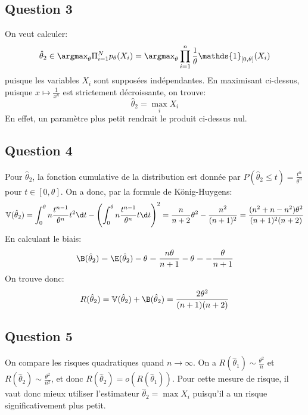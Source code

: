 \documentclass[math, info]{mpb-cours}
\def\that{\hat{\theta}}
\def\V{\mathbb{V}}
\begin{document}
\subsection{Question 3}
On veut calculer:
\begin{equation*}
	\that_{2} \in \argmax_{\theta} \Pi_{i = 1}^{N} p_{\theta}(X_{i}) = \argmax_{\theta} \prod_{i = 1}^{n}\frac{1}{\theta}\mathds{1}_{[0, \theta]}(X_{i})
\end{equation*}
puisque les variables $X_{i}$ sont supposées indépendantes.
En maximisant ci-dessus, puisque $x \mapsto \frac{1}{x^{n}}$ est strictement décroissante, on trouve:
\begin{equation*}
	\that_{2} = \max_{i} X_{i}
\end{equation*}
En effet, un paramètre plus petit rendrait le produit ci-dessus nul.

\subsection{Question 4}
Pour $\that_{2}$, la fonction cumulative de la distribution est donnée par $P(\that_{2} \leq t) = \frac{t^{n}}{\theta^{n}}$ pour $t \in [0, \theta]$.
On a donc, par la formule de König-Huygens:
\begin{equation*}
	\V(\that_{2}) = \int_{0}^{\theta}n \frac{t^{n - 1}}{\theta^{n}}t^{2}\d t - \left(\int_{0}^{\theta}n\frac{t^{n-1}}{\theta^{n}}t\d t \right)^{2} = \frac{n}{n + 2}\theta^{2} - \frac{n^{2}}{(n + 1)^{2}} = \frac{(n^{2} + n - n^{2}) \theta^{2}}{(n + 1)^{2}(n + 2)}
\end{equation*}
En calculant le biais:
\begin{equation*}
	\B(\that_{2}) = \E(\that_{2}) - \theta = \frac{n\theta}{n + 1} - \theta = -\frac{\theta}{n + 1}
\end{equation*}
On trouve donc:
\begin{equation*}
	R(\that_{2}) = \V(\that_{2}) + \B(\that_{2}) = \frac{2\theta^{2}}{(n + 1)(n + 2)}
\end{equation*}

\subsection{Question 5}
On compare les risques quadratiques quand $n \to \infty$. On a $R(\that_{1}) \sim \frac{\theta^{2}}{n}$ et $R(\that_{2}) \sim \frac{\theta^{2}}{n^{2}}$, et donc $R(\that_{2}) = o(R(\that_{1}))$.
Pour cette mesure de risque, il vaut donc mieux utiliser l'estimateur $\that_{2} = \max X_{i}$ puisqu'il a un risque significativement plus petit.
\end{document}
